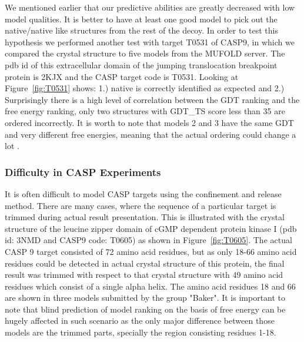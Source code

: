 \documentclass[12pt]{article}
\begin{document}
We mentioned earlier that our predictive abilities are greatly decreased with low model qualities. It is
better to have at least one good model to pick out the native/native like structures from the rest of the decoy. 
In order to test this hypothesis we performed another test with target T0531 of CASP9, in which we compared the crystal 
structure to five models from the MUFOLD server. The pdb id of this extracellular domain of the jumping translocation 
breakpoint protein is 2KJX and the CASP target code is T0531.
Looking at Figure~\ref{fig:T0531} shows: 1.) native is correctly
identified as expected and 2.) Surprisingly there is a high level of correlation between the GDT
ranking and the free energy ranking, only two structures with GDT\_TS score less than  35  are ordered
incorrectly. It is worth to note that models 2 and 3 have the same GDT and very different free
energies, meaning that the actual ordering could change a lot \cite{Perez2012}.

\subsubsection{Difficulty in CASP Experiments}

It is often difficult to model CASP targets using the confinement and release method. There are many cases,
where the sequence of a particular target is trimmed during actual result presentation. This is illustrated
with the crystal structure of the leucine zipper domain of cGMP dependent protein kinase I (pdb id: 3NMD
and CASP9 code: T0605) as shown in Figure~\ref{fig:T0605}. The actual CASP 9 target consisted of 72 amino acid residues, but
as only 18-66 amino acid residues could be detected in actual crystal structure of this protein, the final result was trimmed 
with respect to that crystal structure with 49 amino acid residues which consist of a single alpha helix. The amino acid residues 18 and 66 are shown in
three models submitted by the group "Baker". It is important to note that blind prediction of model ranking on the basis of free energy can be hugely 
affected in such scenario as the only major difference between those models are the trimmed parts, specially the region consisting residues 1-18.    
\end{document}
